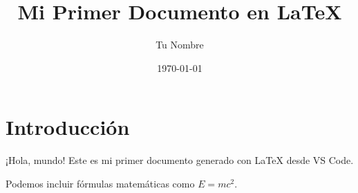 \documentclass{article}
\title{Mi Primer Documento en LaTeX}
\author{Tu Nombre}
\date{\today}
\begin{document}
\maketitle

\section{Introducción}
¡Hola, mundo! Este es mi primer documento generado con LaTeX desde VS Code.



Podemos incluir fórmulas matemáticas como \( E = mc^2 \).
\end{document}
